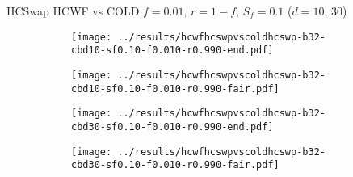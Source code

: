 \documentclass[8pt,a4paper]{beamer}
\begin{document}
	\begin{frame}{HCSwap HCWF vs COLD $f=0.01,\, r=1-f,\,S_f=0.1$  ($d=10,\, 30$)}
		\begin{figure}
			\begin{subfigure}{.48\textwidth}
				\centering
				\texttt{[image: ../results/hcwfhcswpvscoldhcswp-b32-cbd10-sf0.10-f0.010-r0.990-end.pdf]}
			\end{subfigure}
			\begin{subfigure}{.48\textwidth}
				\centering
				\texttt{[image: ../results/hcwfhcswpvscoldhcswp-b32-cbd10-sf0.10-f0.010-r0.990-fair.pdf]}
			\end{subfigure}
		\end{figure}

		\begin{figure}
			\begin{subfigure}{.48\textwidth}
				\centering
				\texttt{[image: ../results/hcwfhcswpvscoldhcswp-b32-cbd30-sf0.10-f0.010-r0.990-end.pdf]}
			\end{subfigure}
			\begin{subfigure}{.48\textwidth}
				\centering
				\texttt{[image: ../results/hcwfhcswpvscoldhcswp-b32-cbd30-sf0.10-f0.010-r0.990-fair.pdf]}
			\end{subfigure}
		\end{figure}
	\end{frame}





	
\end{document}
